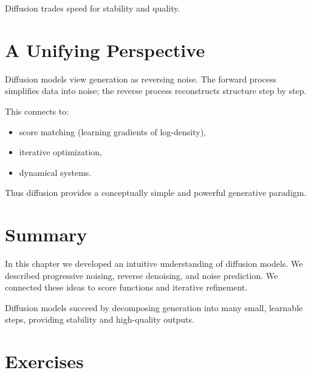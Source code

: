 Diffusion trades speed for stability and quality.

\section{A Unifying Perspective}

Diffusion models view generation as reversing noise. The forward process simplifies data into noise; the reverse process reconstructs structure step by step.

This connects to:
\begin{itemize}
    \item score matching (learning gradients of log-density),
    \item iterative optimization,
    \item dynamical systems.
\end{itemize}

Thus diffusion provides a conceptually simple and powerful generative paradigm.

\section{Summary}

In this chapter we developed an intuitive understanding of diffusion models. We described progressive noising, reverse denoising, and noise prediction. We connected these ideas to score functions and iterative refinement.

Diffusion models succeed by decomposing generation into many small, learnable steps, providing stability and high-quality outputs.

\section*{Exercises}

